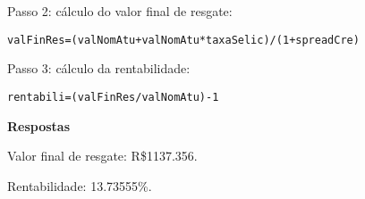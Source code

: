 \documentclass{article}\usepackage[]{graphicx}\usepackage[]{xcolor}
\makeatletter
\newcommand{\hlnum}[1]{\textcolor[rgb]{0.686,0.059,0.569}{#1}}%
\newcommand{\hlopt}[1]{\textcolor[rgb]{0,0,0}{#1}}%
\newcommand{\hlstd}[1]{\textcolor[rgb]{0.345,0.345,0.345}{#1}}%
\newcommand{\hlkwb}[1]{\textcolor[rgb]{0.69,0.353,0.396}{#1}}%
\newenvironment{kframe}{%
 \def\at@end@of@kframe{}%
 \ifinner\ifhmode%
  \def\at@end@of@kframe{\end{minipage}}%
  \begin{minipage}{\columnwidth}%
 \fi\fi%
 \def\FrameCommand##1{\hskip\@totalleftmargin \hskip-\fboxsep
 \colorbox{shadecolor}{##1}\hskip-\fboxsep
     \hskip-\linewidth \hskip-\@totalleftmargin \hskip\columnwidth}%
 \MakeFramed {\advance\hsize-\width
   \@totalleftmargin\z@ \linewidth\hsize
   \@setminipage}}%
 {\par\unskip\endMakeFramed%
 \at@end@of@kframe}
\newenvironment{knitrout}{}{} %
\makeatother
\begin{document}
Passo 2: cálculo do valor final de resgate:\par

\begin{knitrout}
\color{fgcolor}\begin{kframe}
\begin{alltt}
\hlstd{valFinRes} \hlkwb{=} \hlstd{( valNomAtu} \hlopt{+} \hlstd{valNomAtu} \hlopt{*} \hlstd{taxaSelic )} \hlopt{/} \hlstd{(} \hlnum{1} \hlopt{+} \hlstd{spreadCre )}
\end{alltt}
\end{kframe}
\end{knitrout}

Passo 3: cálculo da rentabilidade:

\begin{knitrout}
\color{fgcolor}\begin{kframe}
\begin{alltt}
\hlstd{rentabili} \hlkwb{=} \hlstd{( valFinRes} \hlopt{/} \hlstd{valNomAtu )} \hlopt{-} \hlnum{1}
\end{alltt}
\end{kframe}
\end{knitrout}

\textbf{Respostas}\par

Valor final de resgate: R\$1137.356.

Rentabilidade: 13.73555\%.


\end{document}
